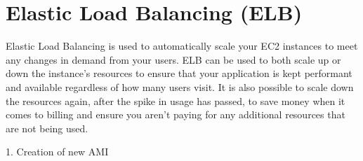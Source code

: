 \chapter{Elastic Load Balancing (ELB)}\label{ch:elastic-load-balancing}

Elastic Load Balancing is used to automatically scale your EC2 instances to meet any changes in demand from your users.
ELB can be used to both scale up or down the instance's resources to ensure that your application is kept performant and
available regardless of how many users visit.
It is also possible to scale down the resources again, after the spike in usage has passed, to save money when it comes
to billing and ensure you aren't paying for any additional resources that are not being used.

1. Creation of new AMI

